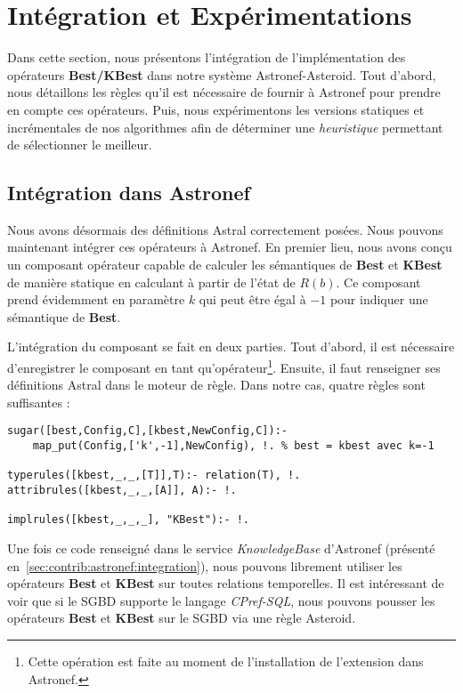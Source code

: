 \section{Intégration et Expérimentations}\label{sec:ext:prefs:integration}
Dans cette section, nous présentons l'intégration de l'implémentation des opérateurs \textbf{Best/KBest} dans notre système Astronef-Asteroid. Tout d'abord, nous détaillons les règles qu'il est nécessaire de fournir à Astronef pour prendre en compte ces opérateurs. Puis, nous expérimentons les versions statiques et incrémentales de nos algorithmes afin de déterminer une \textit{heuristique} permettant de sélectionner le meilleur.

\subsection{Intégration dans Astronef}
Nous avons désormais des définitions Astral correctement posées. Nous pouvons maintenant intégrer ces opérateurs à Astronef. En premier lieu, nous avons conçu un composant opérateur capable de calculer les sémantiques de \textbf{Best} et \textbf{KBest} de manière statique en calculant à partir de l'état de $R(b)$. Ce composant prend évidemment en paramètre $k$ qui peut être égal à $-1$ pour indiquer une sémantique de \textbf{Best}.

L'intégration du composant se fait en deux parties. Tout d'abord, il est nécessaire d'enregistrer le composant en tant qu'opérateur\footnote{Cette opération est faite au moment de l'installation de l'extension dans Astronef.}. Ensuite, il faut renseigner ses définitions Astral dans le moteur de règle. Dans notre cas, quatre règles sont suffisantes :
\begin{lstlisting}
sugar([best,Config,C],[kbest,NewConfig,C]):-
    map_put(Config,['k',-1],NewConfig), !. % best = kbest avec k=-1

typerules([kbest,_,_,[T]],T):- relation(T), !.
attribrules([kbest,_,_,[A]], A):- !.

implrules([kbest,_,_,_], "KBest"):- !.
\end{lstlisting}

Une fois ce code renseigné dans le service \textit{KnowledgeBase} d'Astronef (présenté en~\ref{sec:contrib:astronef:integration}), nous pouvons librement utiliser les opérateurs \textbf{Best} et \textbf{KBest} sur toutes relations temporelles. Il est intéressant de voir que si le SGBD supporte le langage \textit{CPref-SQL}, nous pouvons pousser les opérateurs \textbf{Best} et \textbf{KBest} sur le SGBD via une règle Asteroid. 

